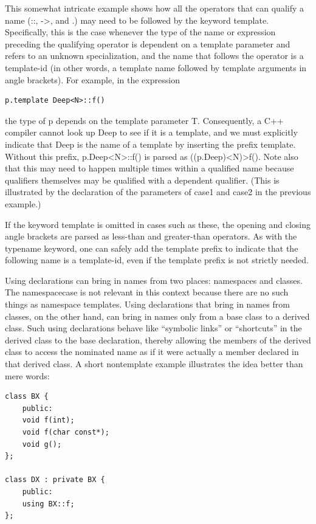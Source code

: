 This somewhat intricate example shows how all the operators that can qualify a name (::, ->, and .) may need to be followed by the keyword template. Specifically, this is the case whenever the type of the name or expression preceding the qualifying operator is dependent on a template parameter and refers to an unknown specialization, and the name that follows the operator is a template-id (in other words, a template name followed by template arguments in angle brackets). For example, in the expression

\begin{lstlisting}[style=styleCXX]
p.template Deep<N>::f()
\end{lstlisting}

the type of p depends on the template parameter T. Consequently, a C++ compiler cannot look up Deep to see if it is a template, and we must explicitly indicate that Deep is the name of a template by inserting the prefix template. Without this prefix, p.Deep<N>::f() is parsed as ((p.Deep)<N)>f(). Note also that this may need to happen multiple times within a qualified name because qualifiers themselves may be qualified with a dependent qualifier. (This is illustrated by the declaration of the parameters of case1 and case2 in the previous example.)

If the keyword template is omitted in cases such as these, the opening and closing angle brackets are parsed as less-than and greater-than operators. As with the typename keyword, one can safely add the template prefix to indicate that the following name is a template-id, even if the template prefix is not strictly needed.


Using declarations can bring in names from two places: namespaces and classes. The namespacecase is not relevant in this context because there are no such things as namespace templates. Using declarations that bring in names from classes, on the other hand, can bring in names only from a base class to a derived class. Such using declarations behave like “symbolic links” or “shortcuts” in the derived class to the base declaration, thereby allowing the members of the derived class to access the nominated name as if it were actually a member declared in that derived class. A short nontemplate example illustrates the idea better than mere words:

\begin{lstlisting}[style=styleCXX]
class BX {
	public:
	void f(int);
	void f(char const*);
	void g();
};

class DX : private BX {
	public:
	using BX::f;
};
\end{lstlisting}

